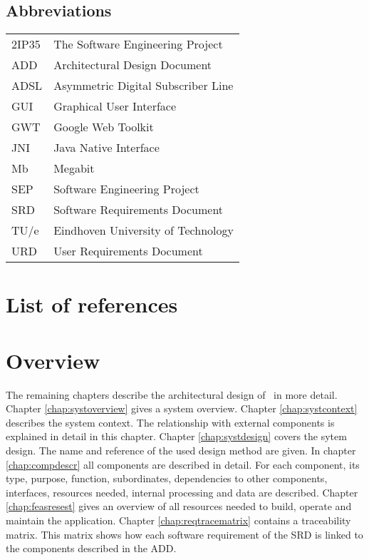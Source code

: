 \subsection{Abbreviations}
\begin{tabular}{l|l}
2IP35 & The Software Engineering Project \\
ADD & Architectural Design Document \\
ADSL & Asymmetric Digital Subscriber Line \\
GUI & Graphical User Interface \\
GWT & Google Web Toolkit \\
JNI & Java Native Interface \\
Mb & Megabit \\
SEP   & Software Engineering Project \\
SRD   & Software Requirements Document \\
TU/e  & Eindhoven University of Technology \\
URD   & User Requirements Document \\
\end{tabular}

\section{List of references}


\section{Overview}
The remaining chapters describe the architectural design of \projectname\ in more detail. Chapter \ref{chap:systoverview} gives a system overview. Chapter \ref{chap:systcontext} describes the system context. The relationship with external components is explained in detail in this chapter. Chapter \ref{chap:systdesign} covers the sytem design. The name and reference of the used design method are given.
In chapter \ref{chap:compdescr} all components are described in detail. For each component, its type, purpose, function, subordinates, dependencies to other components, interfaces, resources needed, internal processing and  data are described. Chapter \ref{chap:feasresest} gives an overview of all resources needed to build, operate and maintain the application. Chapter \ref{chap:reqtracematrix} contains a traceability matrix. This matrix shows how each software requirement of the SRD \cite{srd} is linked to the components described in the ADD.


